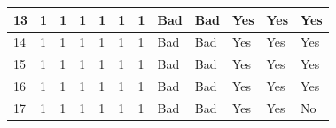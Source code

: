\begin{table}[H]
\begin{tabular}{|l|l|l|l|l|l|l|l|l|l|l|l|}
13                                                          & 1  & 1    & 1   & 1     & 1    & 1                                                                     & Bad                                                     & Bad                                                      & Yes                                                                   & Yes                                                                   & Yes                                                                   \\ \hline
14                                                          & 1  & 1    & 1   & 1     & 1    & 1                                                                     & Bad                                                     & Bad                                                      & Yes                                                                   & Yes                                                                   & Yes                                                                   \\ \hline
15                                                          & 1  & 1    & 1   & 1     & 1    & 1                                                                     & Bad                                                     & Bad                                                      & Yes                                                                   & Yes                                                                   & Yes                                                                   \\ \hline
16                                                          & 1  & 1    & 1   & 1     & 1    & 1                                                                     & Bad                                                     & Bad                                                      & Yes                                                                   & Yes                                                                   & Yes                                                                   \\ \hline
17                                                          & 1  & 1    & 1   & 1     & 1    & 1                                                                     & Bad                                                     & Bad                                                      & Yes                                                                   & Yes                                                                   & No                                                                    \\ \hline

\end{tabular}
\end{table}
